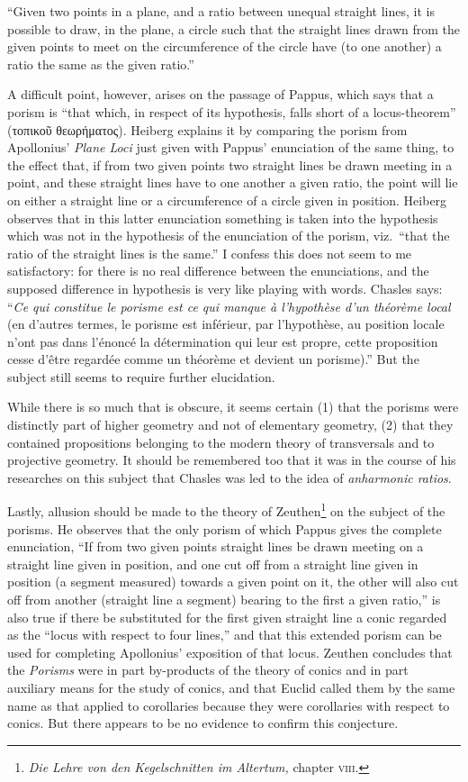 ``Given two points in a plane, and a ratio between unequal straight lines, it is possible to draw, in the plane, a circle such that the straight lines drawn from the given points to meet on the circumference of the circle have (to one another) a ratio the same as the given ratio.''

A difficult point, however, arises on the passage of Pappus, which says that a porism is ``that which, in respect of its hypothesis, falls short of a locus-theorem'' (τοπικοῦ θεωρήματος). Heiberg explains it by comparing the porism from Apollonius' \emph{Plane Loci} just given with Pappus' enunciation of the same thing, to the effect that, if from two given points two straight lines be drawn meeting in a point, and these straight lines have to one another a given ratio, the point will lie on either a straight line or a circumference of a circle given in position. Heiberg observes that in this latter enunciation something is taken into the hypothesis which was not in the hypothesis of the enunciation of the porism, viz.\ ``that the ratio of the straight lines is the same.'' I confess this does not seem to me satisfactory: for there is no real difference between the enunciations, and the supposed difference in hypothesis is very like playing with words. Chasles says: ``\emph{Ce qui constitue le porisme est ce qui manque à l'hypothèse d'un théorème local} (en d'autres termes, le porisme est inférieur, par l'hypothèse, au position locale n'ont pas dans l'énoncé la détermination qui leur est propre, cette proposition cesse d'être regardée comme un théorème et devient un porisme).'' But the subject still seems to require further elucidation.

While there is so much that is obscure, it seems certain (1) that the porisms were distinctly part of higher geometry and not of elementary geometry, (2) that they contained propositions belonging to the modern theory of transversals and to projective geometry. It should be remembered too that it was in the course of his researches on this subject that Chasles was led to the idea of \emph{anharmonic ratios}.

Lastly, allusion should be made to the theory of Zeuthen\footnote{\emph{Die Lehre von den Kegelschnitten im Altertum,} chapter \textsc{viii}.} on the subject of the porisms. He observes that the only porism of which Pappus gives the complete enunciation, ``If from two given points straight lines be drawn meeting on a straight line given in position, and one cut off from a straight line given in position (a segment measured) towards a given point on it, the other will also cut off from another (straight line a segment) bearing to the first a given ratio,'' is also true if there be substituted for the first given straight line a conic regarded as the ``locus with respect to four lines,'' and that this extended porism can be used for completing Apollonius' exposition of that locus. Zeuthen concludes that the \emph{Porisms} were in part by-products of the theory of conics and in part auxiliary means for the study of conics, and that Euclid called them by the same name as that applied to corollaries because they were corollaries with respect to conics. But there appears to be no evidence to confirm this conjecture.

